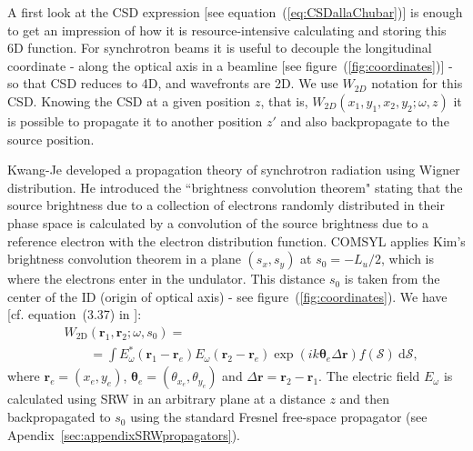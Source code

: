 \documentclass{iucr}              %
\begin{document}
A first look at the CSD expression [see equation~(\ref{eq:CSDallaChubar})] is enough to get an impression of how it is resource-intensive calculating and storing this 6D function. For synchrotron beams it is useful to decouple the longitudinal coordinate - along the optical axis in a beamline [see figure~(\ref{fig:coordinates})] - so that CSD reduces to 4D, and wavefronts are 2D. We use $W_{2D}$ notation for this CSD. Knowing the CSD at a given position $z$, that is, $W_{2D}(x_1,y_1,x_2,y_2; \omega, z)$ it is possible to propagate it to another position $z'$ and also backpropagate to the source position.

Kwang-Je  developed a propagation theory of synchrotron radiation using Wigner distribution. He introduced the ``brightness convolution theorem" stating that the source brightness due to a collection of electrons randomly distributed in their phase space is calculated by a convolution of the source brightness due to a reference electron with the electron distribution function. 
COMSYL applies Kim's brightness convolution theorem in a plane $(s_x,s_y)$ at $s_0=-L_u\big/2$, which is where the  electrons enter in the undulator. This distance $s_0$ is taken from the center of the ID (origin of optical axis) - see figure~(\ref{fig:coordinates}). We have [cf. equation~(3.37) in \cite{glassThesis}]:
\begin{equation}\label{eq:comsyl_W2D}
\begin{split}
& W_\text{2D}(\textbf{r}_1,\textbf{r}_2;\omega,s_0) = \\
&\qquad=\int E_\omega^*(\textbf{r}_1-\textbf{r}_e)
    E_\omega(\textbf{r}_2-\textbf{r}_e) \exp(i k \mathbf{\theta}_e\Delta\textbf{r})f(\mathcal{S})~\text{d}\mathcal{S},
\end{split}
\end{equation}
where $\textbf{r}_e=(x_e,y_e)$, $\mathbf{\theta}_e=(\theta_{x_e},\theta_{y_e})$ and $\Delta\textbf{r}=\textbf{r}_2-\textbf{r}_1$. The electric field $E_\omega$ is calculated using SRW in an arbitrary plane at a distance $z$ and then backpropagated to $s_0$ using the standard Fresnel free-space propagator (see Apendix~\ref{sec:appendixSRWpropagators}).
\end{document}
